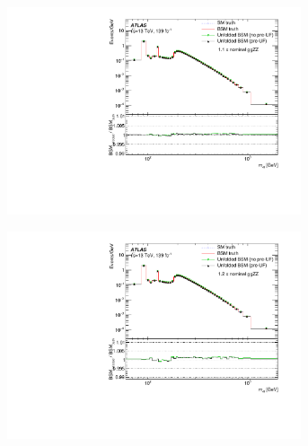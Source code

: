 \begin{figure}[h!]
    \begin{subfigure}{.43\textwidth}\centering\includegraphics[width = 0.95\textwidth]{Figures/m4l/InjectionTests/1dot1xggllll_injection.pdf}\caption{}\label{fig:injection_6dot175fb_300w15}\end{subfigure}
    \begin{subfigure}{.43\textwidth}\centering\includegraphics[width = 0.95\textwidth]{Figures/m4l/InjectionTests/1dot2xggllll_injection.pdf}\caption{}\label{fig:injection_0dot862fb_800w15}\end{subfigure}

\end{figure}
